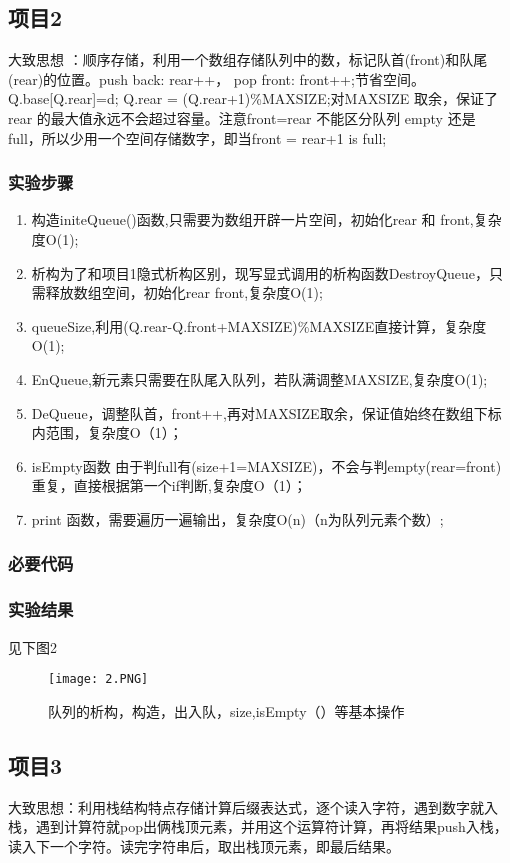 \subsection{项目2}
大致思想 ：顺序存储，利用一个数组存储队列中的数，标记队首(front)和队尾(rear)的位置。push back:  rear++， pop front:  front++;节省空间。Q.base[Q.rear]=d; Q.rear = (Q.rear+1)\%MAXSIZE;对MAXSIZE 取余，保证了 rear 的最大值永远不会超过容量。注意front=rear 不能区分队列 empty 还是 full，所以少用一个空间存储数字，即当front = rear+1  is full; 
\subsubsection{实验步骤}
\begin{enumerate}
\item 构造initeQueue()函数,只需要为数组开辟一片空间，初始化rear 和 front,复杂度O(1);
\item 析构为了和项目1隐式析构区别，现写显式调用的析构函数DestroyQueue，只需释放数组空间，初始化rear front,复杂度O(1);
\item queueSize,利用(Q.rear-Q.front+MAXSIZE)\%MAXSIZE直接计算，复杂度O(1);
\item EnQueue,新元素只需要在队尾入队列，若队满调整MAXSIZE,复杂度O(1);
\item DeQueue，调整队首，front++,再对MAXSIZE取余，保证值始终在数组下标内范围，复杂度O（1）；
\item isEmpty函数  由于判full有(size+1=MAXSIZE)，不会与判empty(rear=front)重复，直接根据第一个if判断,复杂度O（1）；
\item print 函数，需要遍历一遍输出，复杂度O(n)（n为队列元素个数）;
\end{enumerate}
\subsubsection{必要代码}

\subsubsection{实验结果}见下图2
	\begin{figure}[!bthp]
	\centering
        \texttt{[image: 2.PNG]}
        \caption{队列的析构，构造，出入队，size,isEmpty（）等基本操作}
      \end{figure}


\subsection{项目3}
大致思想：利用栈结构特点存储计算后缀表达式，逐个读入字符，遇到数字就入栈，遇到计算符就pop出俩栈顶元素，并用这个运算符计算，再将结果push入栈，读入下一个字符。读完字符串后，取出栈顶元素，即最后结果。 
